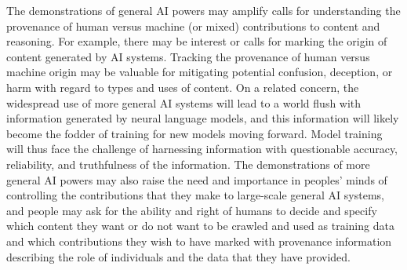 The demonstrations of general AI powers may amplify calls for understanding the provenance of human versus machine (or mixed) contributions to content and reasoning.  For example, there may be interest or calls for marking the origin of content generated by AI systems. Tracking the provenance of human versus machine origin may be valuable for mitigating potential confusion, deception, or harm with regard to types and uses of content. On a related concern, the widespread use of more general AI systems will lead to a world flush with information generated by neural language models, and this information will likely become the fodder of training for new models moving forward. Model training will thus face the challenge of harnessing information with questionable accuracy, reliability, and truthfulness of the information. The demonstrations of more general AI powers may also raise the need and importance in peoples’ minds of controlling the contributions that they make to large-scale general AI systems, and people may ask for the ability and right of humans to decide and specify which content they want or do not want to be crawled and used as training data and which contributions they wish to have marked with provenance information describing the role of individuals and the data that they have provided. 





